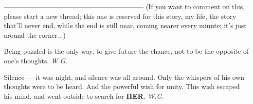 --------------------------------------------------------------
(If you want to comment on this, please start a new thread; this one is reserved for this story, my life, the story that'll never end, while the end is still near, coming nearer every minute; it's just around the corner...)

Being puzzled 
is the only way, 
to give future the chance, 
not to be the opposite of one's thoughts. 
\emph{W.G.}

Silence --- 
it was night, and silence was all around. 
Only the whispers of his own thoughts were to be heard. 
And the powerful wish 
for unity. 
This wish 
escaped his mind, 
and went outside 
to search for \textbf{HER}. 
\emph{W.G.}

